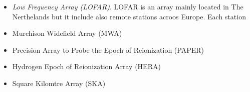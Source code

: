 {\begin{itemize}
\item {\it Low Frequency Array (LOFAR)}. LOFAR is an array mainly located in The Nerthelands but it include also remote stations acroos Europe. Each station

\item Murchison Widefield Array (MWA)

\item Precision Array to Probe the Epoch of Reionization (PAPER)

\item Hydrogen Epoch of Reionization Array (HERA)

\item Square Kilomtre Array (SKA)

\end{itemize}


%
}
